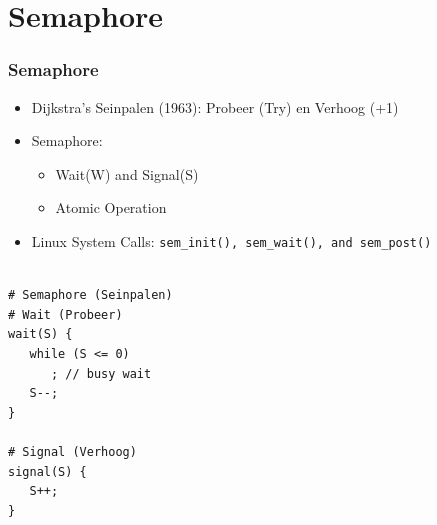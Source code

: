 \documentclass[aspectratio=169, xcolor=table, notheorems, hyperref={pdfpagelabels=false}]{beamer}
\begin{document}
\section{Semaphore}
\begin{frame}[fragile]
\frametitle{Semaphore}
\begin{itemize}
\item Dijkstra's Seinpalen (1963): Probeer (Try) en Verhoog (+1)
\item Semaphore:
\begin{itemize}
\item Wait(W) and Signal(S)
\item Atomic Operation
\end{itemize}
\item Linux System Calls: \texttt{sem\_init(), sem\_wait(), and sem\_post()}
\end{itemize}

\begin{lstlisting}[basicstyle=\ttfamily\footnotesize]

# Semaphore (Seinpalen)
# Wait (Probeer)
wait(S) {
   while (S <= 0)
      ; // busy wait
   S--;
}

# Signal (Verhoog)
signal(S) {
   S++;
}

\end{lstlisting}

\end{frame}

\end{document}
